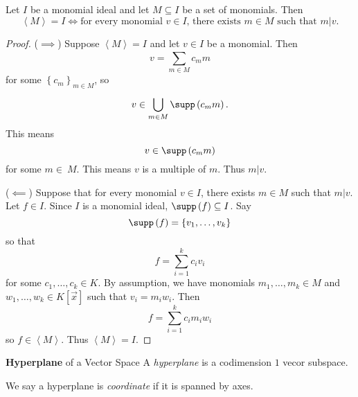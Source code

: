 \documentclass[co439]{subfiles}
\begin{document}
    \begin{cor}{}
        Let $I$ be a monomial ideal and let $M\subseteq I$ be a set of monomials. Then
        \begin{equation*}
            \left< M \right> = I \iff \text{for every monomial $v\in I$, there exists $m\in M$ such that $m|v$.} 
        \end{equation*}
    \end{cor}	

    \begin{proof}
        ($\implies$) Suppose $\left< M \right> = I$ and let $v\in I$ be a monomial. Then
        \begin{equation*}
            v = \sum^{}_{m\in M} c_mm
        \end{equation*}
        for some $\left\lbrace c_m \right\rbrace^{}_{m\in M}$, so
        \begin{equation*}
            v \in \bigcup^{}_{m\in M}\supp\left( c_mm \right).
        \end{equation*}
        This means
        \begin{equation*}
            v \in \supp\left( c_mm \right)
        \end{equation*}
        for some $m\in\ M$. This means $v$ is a multiple of $m$. Thus $m|v$.

        ($\impliedby$) Suppose that for every monomial $v\in I$, there exists $m\in M$ such that $m|v$. Let $f\in I$. Since $I$ is a monomial ideal, $\supp\left( f \right)\subseteq I$. Say
        \begin{equation*}
            \supp\left( f \right) = \left\lbrace v_1,\ldots,v_k \right\rbrace
        \end{equation*}
        so that
        \begin{equation*}
            f = \sum^{k}_{i=1} c_iv_i
        \end{equation*}
        for some $c_1,\ldots,c_k\in K$. By assumption, we have monomials $m_1,\ldots,m_k\in M$ and $w_1,\ldots,w_k\in K\left[ \vec{x} \right]$ such that $v_i=m_iw_i$. Then
        \begin{equation*}
            f = \sum^{k}_{i=1} c_im_iw_i
        \end{equation*}
        so $f\in\left< M \right>$. Thus $\left< M \right> = I$.  
    \end{proof}

    \begin{definition}{\textbf{Hyperplane} of a Vector Space}
        A \emph{hyperplane} is a codimension $1$ vecor subspace.

        We say a hyperplane is \emph{coordinate} if it is spanned by axes.
    \end{definition}
\end{document}
